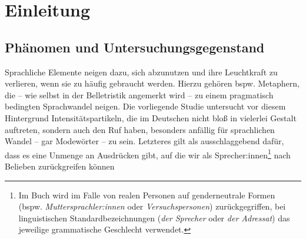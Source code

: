 
\chapter{Einleitung}
\label{Einleitung}
\smallskip



\section{Phänomen und Untersuchungsgegenstand}\label{abs:problem}
Sprachliche Elemente neigen dazu, sich abzunutzen und ihre Leuchtkraft zu verlieren, wenn sie zu häufig gebraucht werden. Hierzu gehören bspw. Metaphern, die -- wie selbst in der Belletristik angemerkt wird {\citep[vgl.][453f.]{Mercier.2020}} -- zu einem pragmatisch bedingten Sprachwandel neigen. Die vorliegende Studie untersucht vor diesem Hintergrund Intensitätspartikeln, die im Deutschen nicht bloß in vielerlei Gestalt auftreten, sondern auch den Ruf haben, besonders anfällig für sprachlichen Wandel -- gar \glqq{}Modewörter\grqq{} \citep[267]{Becher.1907} -- zu sein. Letzteres gilt als ausschlaggebend dafür, dass es eine Unmenge an Ausdrücken gibt, auf die wir als Sprecher:innen\footnote{Im Buch wird im Falle von realen Personen auf genderneutrale Formen (bspw. \textit{Muttersprachler:innen} oder \textit{Versuchspersonen}) zurückgegriffen, bei linguistischen Standardbezeichnungen (\textit{der Sprecher} oder \textit{der Adressat}) das jeweilige grammatische Geschlecht verwendet.} nach Belieben zurückgreifen können
